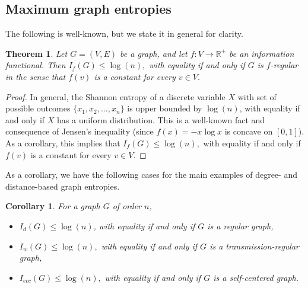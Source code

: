 \documentclass{article}
\newtheorem{cor}[defi]{Corollary}
\newtheorem{thr}[defi]{Theorem}
\newcommand{\ecc}{ecc}
\newcommand{\diam}{diam}
\newcommand{\rad}{rad}
\begin{document}
{\subsection{Maximum graph entropies}\label{subsec:maxI_G}

The following is well-known, but we state it in general for clarity.

\begin{thr}
    Let $G=(V,E)$ be a graph, and let $f:V \rightarrow \mathbb{R}^{+}$ be an information functional.
    Then $I_f(G) \le \log(n),$ with equality if and only if $G$ is $f$-regular in the sense that $f(v)$ is a constant for every $v \in V.$
\end{thr}

\begin{proof}
    In general, the Shannon entropy of a discrete variable $X$ with set of possible outcomes $\{x_1,x_2,\ldots,x_n\}$ is upper bounded by $\log(n)$, with equality if and only if $X$ has a uniform distribution.
    This is a well-known fact and consequence of Jensen's inequality (since $f(x)=-x \log x$ is concave on $[0,1]$).
    As a corollary, this implies that $I_f(G) \le \log(n),$ with equality if and only if $f(v)$ is a constant for every $v \in V.$ 
\end{proof}

As a corollary, we have the following cases for the main examples of degree- and distance-based graph entropies.

\begin{cor}
    For a graph $G$ of order $n$, 
    \begin{itemize}
        \item $I_d(G) \le \log (n)$, with equality if and only if $G$ is a regular graph,
        \item $I_w(G) \le \log(n),$ with equality if and only if $G$ is a transmission-regular graph,
        \item $I_{\ecc}(G) \le \log(n),$ with equality if and only if $G$ is a self-centered graph. %
    \end{itemize}
\end{cor}


}
\end{document}
